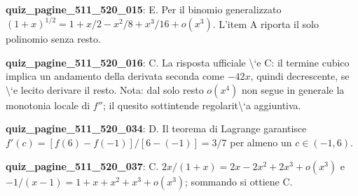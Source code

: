 \documentclass[11pt,a4paper]{article}
\newcounter{quiz}
\begin{document}
\noindent\textbf{quiz\_pagine\_511\_520\_015}: E. Per il binomio generalizzato $(1+x)^{1/2}=1+x/2-x^2/8+x^3/16+o(x^3)$. L'item A riporta il solo polinomio senza resto.\par\medskip
\noindent\textbf{quiz\_pagine\_511\_520\_016}: C. La risposta ufficiale \textbackslash{}`e C: il termine cubico implica un andamento della derivata seconda come $-42x$, quindi decrescente, se \textbackslash{}`e lecito derivare il resto. Nota: dal solo resto $o(x^4)$ non segue in generale la monotonia locale di $f''$; il quesito sottintende regolarit\textbackslash{}`a aggiuntiva.\par\medskip
\noindent\textbf{quiz\_pagine\_511\_520\_034}: D. Il teorema di Lagrange garantisce $f'(c)=[f(6)-f(-1)]/[6-(-1)]=3/7$ per almeno un $c\in(-1,6)$.\par\medskip
\noindent\textbf{quiz\_pagine\_511\_520\_037}: C. $2x/(1+x)=2x-2x^2+2x^3+o(x^3)$ e $-1/(x-1)=1+x+x^2+x^3+o(x^3)$; sommando si ottiene C.\par\medskip
\end{document}
